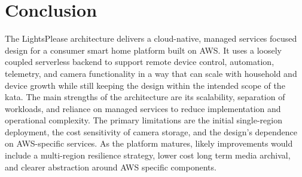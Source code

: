 \section{Conclusion}

The LightsPlease architecture delivers a cloud-native, managed services focused design for a consumer smart home platform built on AWS. It uses a loosely coupled serverless backend to support remote device control, automation, telemetry, and camera functionality in a way that can scale with household and device growth while still keeping the design within the intended scope of the kata. The main strengths of the architecture are its scalability, separation of workloads, and reliance on managed services to reduce implementation and operational complexity. The primary limitations are the initial single-region deployment, the cost sensitivity of camera storage, and the design's dependence on AWS-specific services. As the platform matures, likely improvements would include a multi-region resilience strategy, lower cost long term media archival, and clearer abstraction around AWS specific components.